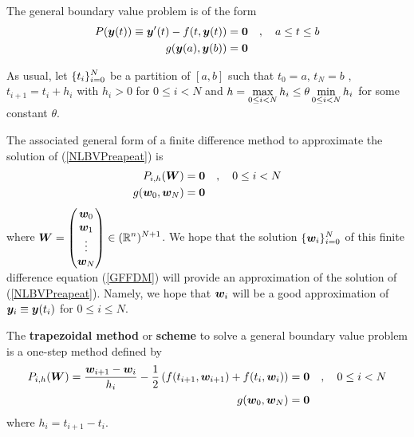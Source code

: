 The general boundary value problem is of the form
\begin{equation}\label{NLBVPreapeat}
\begin{split}
P(\bm{y}(t)) \equiv \bm{y}'(t) - f(t,\bm{y}(t)) &= \bm{0}
\quad , \quad a \leq t \leq b\\
g(\bm{y}(a), \bm{y}(b)) &= \bm{0}
\end{split}
\end{equation}

As usual, let $\displaystyle \{t_i\}_{i=0}^N$ be a partition of
$[a,b]$ such that $t_0 = a$, $t_N = b$ , $t_{i+1} = t_i + h_i$ with $h_i > 0$
for $0\leq i < N$ and
$\displaystyle h = \max_{0\leq i < N} h_i \leq \theta \min_{0\leq i < N} h_i$
for some constant $\theta$.

The associated general form of a finite difference method to
approximate the solution of (\ref{NLBVPreapeat}) is
\begin{equation} \label{GFFDM}
\begin{split}
P_{i,h}(\bm{W}) &= \bm{0}
\quad , \quad 0 \leq i < N \\
g(\bm{w}_0, \bm{w}_N) &= \bm{0}
\end{split}
\end{equation}
where $\displaystyle \bm{W} =
\begin{pmatrix} \bm{w}_0 \\ \bm{w}_1 \\ \vdots \\
\bm{w}_N \end{pmatrix} \in (\mathbb{R}^n)^{N+1}$.
We hope that the solution $\displaystyle \{\bm{w}_i\}_{i=0}^N$ of this finite
difference equation (\ref{GFFDM}) will provide an approximation of the
solution of (\ref{NLBVPreapeat}).  Namely, we hope that
$\bm{w}_i$ will be a good approximation of
$\bm{y}_i \equiv \bm{y}(t_i)$ for $0 \leq i \leq N$.

\begin{egg}
The {\bfseries trapezoidal method} or {\bfseries scheme}
 to solve a
general boundary value problem is a one-step method defined by
\begin{align*}
P_{i,h}(\bm{W}) = \frac{\bm{w}_{i+1}-\bm{w}_i}{h_i} - \frac{1}{2}
\left( f(t_{i+1},\bm{w}_{i+1}) + f(t_i,\bm{w}_i)\right)
&= \bm{0} \quad , \quad 0 \leq i < N\\
g(\bm{w}_0, \bm{w}_N) &= \bm{0}
\end{align*}
where $h_i = t_{i+1}- t_i$.
\end{egg}

